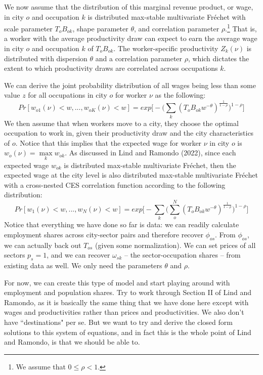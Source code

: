 \documentclass[11pt]{amsart}
\begin{document}
We now assume that the distribution of this marginal revenue product, or wage, in city $o$ and occupation $k$ is distributed max-stable multivariate Fr{\'e}chet with scale parameter $T_{o}{B_{ok}}$, shape parameter $\theta$, and correlation parameter $\rho$.\footnote{We assume that $0\leq\rho{<}1$.} That is, a worker with the average productivity draw can expect to earn the average wage in city $o$ and occupation $k$ of $T_{o}{B_{ok}}$. The worker-specific productivity $Z_{k}(\nu)$ is distributed with dispersion $\theta$ and a correlation parameter $\rho$, which dictates the extent to which productivity draws are correlated across occupations $k$. 

We can derive the joint probability distribution of all wages being less than some value $z$ for all occupations in city $o$ for worker $\nu$ as the following:
\begin{equation}
    {Pr}[w_{o1}(\nu)<w, . . ., w_{oK}(\nu)<w]={exp}\Big[-\Big(\sum\limits_{k}({T_{o}}{B_{ok}}{w^{-\theta}})^{\frac{1}{1-\rho}}\Big)^{1-\rho}\Big]
\end{equation}
We then assume that when workers move to a city, they choose the optimal occupation to work in, given their productivity draw and the city characteristics of $o$. Notice that this implies that the expected wage for worker $\nu$ in city $o$ is $w_{o}(\nu)=\max\limits_{k}{w_{ok}}$. As discussed in Lind and Ramondo (2022), since each expected wage $w_{ok}$ is distributed max-stable multivariate Fr{\'e}chet, then the expected wage at the city level is also distributed max-stable multivariate Fr{\'e}chet with a cross-nested CES correlation function according to the following distribution:
\begin{equation*}
    {Pr}[w_{1}(\nu)<w, . . ., w_{N}(\nu)<w]={exp}\Big[-\sum\limits_{k}\Big(\sum\limits^{N}_{o}({T_{o}}{B_{ok}}{w^{-\theta}})^{\frac{1}{1-\rho}}\Big)^{1-\rho}\Big]
\end{equation*}
Notice that everything we have done so far is data: we can readily calculate employment shares across city-sector pairs and therefore recover $\phi_{os}$. From $\phi_{os}$, we can actually back out $T_{os}$ (given some normalization). We can set prices of all sectors $p_{s}=1$, and we can recover $\omega_{sk}$ -- the sector-occupation shares -- from existing data as well. We only need the parameters $\theta$ and $\rho$. 

For now, we can create this type of model and start playing around with employment and population shares. Try to work through Section II of Lind and Ramondo, as it is basically the same thing that we have done here except with wages and productivities rather than prices and productivities. We also don't have ``destinations" per se. But we want to try and derive the closed form solutions to this system of equations, and in fact this is the whole point of Lind and Ramondo, is that we should be able to.
\end{document}
